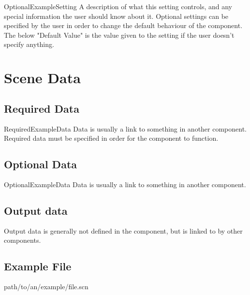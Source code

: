 \begin{componentoption}{OptionalExampleSetting}
A description of what this setting controls, and any special information the user should know about it. Optional settings can be specified by the user in order to change the default behaviour of the component. The below "Default Value" is the value given to the setting if the user doesn't specify anything.
\end{componentoption}

\section{Scene Data}

\subsection{Required Data}

\begin{componentoption}{RequiredExampleData}
Data is usually a link to something in another component. Required data must be specified in order for the component to function.
\end{componentoption}

\subsection{Optional Data}

\begin{componentoption}{OptionalExampleData}
Data is usually a link to something in another component.
\end{componentoption}

\subsection{Output data}
Output data is generally not defined in the component, but is linked to by other components.

\subsection{Example File}
path/to/an/example/file.scn



